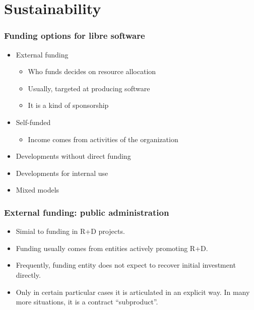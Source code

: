 %

\section{Sustainability}





\begin{frame}
\frametitle{Funding options for libre software}

\begin{itemize}
\item External funding
  \begin{itemize}
    \item Who funds decides on resource allocation
    \item Usually, targeted at producing software
    \item It is a kind of sponsorship
  \end{itemize}
\item Self-funded
  \begin{itemize}
  \item Income comes from activities of the organization
  \end{itemize}
\item Developments without direct funding
\item Developments for internal use
\item Mixed models
\end{itemize}

\end{frame}


\begin{frame}
\frametitle{External funding: public administration}

\begin{itemize}
\item Simial to funding in  R+D projects.
\item Funding usually comes from entities actively promoting R+D.
\item Frequently, funding entity does not expect to recover initial investment directly.
\item Only in certain particular cases it is articulated in an explicit way. In many more
situations, it is a contract ``subproduct''.
\end{itemize}

\end{frame}

